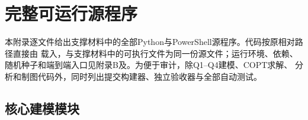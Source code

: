 \section{完整可运行源程序}
本附录逐文件给出支撑材料中的全部Python与PowerShell源程序。代码按原相对路径直接由
\verb||载入，与支撑材料中的可执行文件为同一份源文件；运行环境、依赖、
随机种子和端到端入口见附录B及。为便于审计，除Q1--Q4建模、COPT求解、
分析和制图代码外，同时列出提交构建器、独立验收器与全部自动测试。

\subsection*{核心建模模块}
\subsubsection*{}

\subsubsection*{}

\subsubsection*{}

\subsubsection*{}

\subsubsection*{}

\subsubsection*{}

\subsubsection*{}

